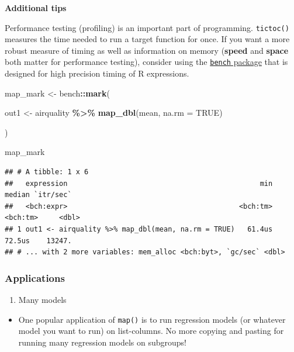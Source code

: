 \documentclass[
]{book}
\newenvironment{Shaded}{\begin{snugshade}}{\end{snugshade}}
\newcommand{\AttributeTok}[1]{\textcolor[rgb]{0.13,0.29,0.53}{#1}}
\newcommand{\ConstantTok}[1]{\textcolor[rgb]{0.56,0.35,0.01}{#1}}
\newcommand{\FunctionTok}[1]{\textcolor[rgb]{0.13,0.29,0.53}{\textbf{#1}}}
\newcommand{\NormalTok}[1]{#1}
\newcommand{\OtherTok}[1]{\textcolor[rgb]{0.56,0.35,0.01}{#1}}
\newcommand{\SpecialCharTok}[1]{\textcolor[rgb]{0.81,0.36,0.00}{\textbf{#1}}}
\providecommand{\tightlist}{%
  \setlength{\itemsep}{0pt}\setlength{\parskip}{0pt}}
\begin{document}
\textbf{Additional tips}

Performance testing (profiling) is an important part of programming. \texttt{tictoc()} measures the time needed to run a target function for once. If you want a more robust measure of timing as well as information on memory (\textbf{speed} and \textbf{space} both matter for performance testing), consider using the \href{https://github.com/r-lib/bench}{\texttt{bench} package} that is designed for high precision timing of R expressions.

\begin{Shaded}
\begin{Highlighting}[]
\NormalTok{map\_mark }\OtherTok{\textless{}{-}}\NormalTok{ bench}\SpecialCharTok{::}\FunctionTok{mark}\NormalTok{(}

\NormalTok{  out1 }\OtherTok{\textless{}{-}}\NormalTok{ airquality }\SpecialCharTok{\%\textgreater{}\%} \FunctionTok{map\_dbl}\NormalTok{(mean, }\AttributeTok{na.rm =} \ConstantTok{TRUE}\NormalTok{)}

\NormalTok{  )}

\NormalTok{map\_mark}
\end{Highlighting}
\end{Shaded}

\begin{verbatim}
## # A tibble: 1 x 6
##   expression                                              min   median `itr/sec`
##   <bch:expr>                                         <bch:tm> <bch:tm>     <dbl>
## 1 out1 <- airquality %>% map_dbl(mean, na.rm = TRUE)   61.4us   72.5us    13247.
## # ... with 2 more variables: mem_alloc <bch:byt>, `gc/sec` <dbl>
\end{verbatim}

\subsubsection{Applications}\label{applications}

\begin{enumerate}
\def\labelenumi{\arabic{enumi}.}
\tightlist
\item
  Many models
\end{enumerate}

\begin{itemize}
\tightlist
\item
  One popular application of \texttt{map()} is to run regression models (or whatever model you want to run) on list-columns. No more copying and pasting for running many regression models on subgroups!
\end{itemize}
\end{document}
